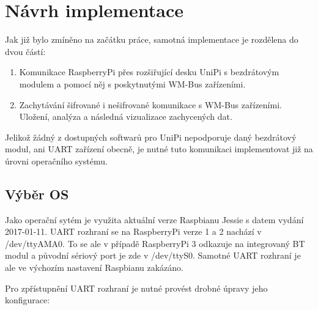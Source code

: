 \chapter{Návrh implementace}
Jak již bylo zmíněno na začátku práce, samotná implementace je rozdělena do dvou částí:
\begin{enumerate}
	\item Komunikace RaspberryPi přes rozšiřující desku UniPi s bezdrátovým modulem a pomocí něj s poskytnutými WM-Bus zařízeními.
	\item Zachytávání šifrované i nešifrované komunikace s WM-Bus zařízeními. Uložení, analýza a následná vizualizace zachycených dat. 
\end{enumerate}

Jelikož žádný z dostupných softwarů pro UniPi nepodporuje daný bezdrátový modul, ani UART zařízení obecně, je nutné tuto komunikaci implementovat již na úrovni operačního systému.


\section{Výběr OS}
Jako operační sytém je využita aktuální verze Raspbianu Jessie s datem vydání 2017-01-11. UART rozhraní se na RaspberryPi verze 1 a 2 nachází v /dev/ttyAMA0. To se ale v případě RaspberryPi 3 odkazuje na integrovaný BT modul a původní sériový port je zde v /dev/ttyS0. Samotné UART rozhraní je ale ve výchozím nastavení Raspbianu zakázáno.

Pro zpřístupnění UART rozhraní je nutné provést drobné úpravy jeho konfigurace:


